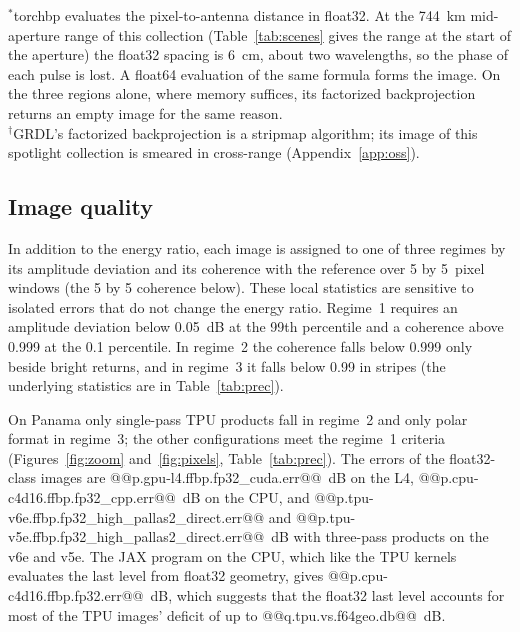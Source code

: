 \documentclass[11pt]{article}
\begin{document}
\begin{table}[tbp]
\smallskip
\begin{minipage}{0.92\textwidth}\footnotesize
$^*$torchbp evaluates the pixel-to-antenna distance in float32. At the 744~km mid-aperture range of this collection (Table~\ref{tab:scenes} gives the range at the start of the aperture) the float32 spacing is 6~cm, about two wavelengths, so the phase of each pulse is lost. A float64 evaluation of the same formula forms the image. On the three regions alone, where memory suffices, its factorized backprojection returns an empty image for the same reason.\\
$^\dagger$GRDL's factorized backprojection is a stripmap algorithm; its image of this spotlight collection is smeared in cross-range (Appendix~\ref{app:oss}).
\end{minipage}
\end{table}

\subsection{Image quality}
\label{sec:quality}

In addition to the energy ratio, each image is assigned to one of three regimes by its amplitude deviation and its coherence with the reference over 5 by 5~pixel windows (the 5 by 5 coherence below). These local statistics are sensitive to isolated errors that do not change the energy ratio. Regime~1 requires an amplitude deviation below 0.05~dB at the 99th percentile and a coherence above 0.999 at the 0.1 percentile. In regime~2 the coherence falls below 0.999 only beside bright returns, and in regime~3 it falls below 0.99 in stripes (the underlying statistics are in Table~\ref{tab:prec}).

On Panama only single-pass TPU products fall in regime~2 and only polar format in regime~3; the other configurations meet the regime~1 criteria (Figures~\ref{fig:zoom} and~\ref{fig:pixels}, Table~\ref{tab:prec}). The errors of the float32-class images are @@p.gpu-l4.ffbp.fp32_cuda.err@@~dB on the L4, @@p.cpu-c4d16.ffbp.fp32_cpp.err@@~dB on the CPU, and @@p.tpu-v6e.ffbp.fp32_high_pallas2_direct.err@@ and @@p.tpu-v5e.ffbp.fp32_high_pallas2_direct.err@@~dB with three-pass products on the v6e and v5e. The JAX program on the CPU, which like the TPU kernels evaluates the last level from float32 geometry, gives @@p.cpu-c4d16.ffbp.fp32.err@@~dB, which suggests that the float32 last level accounts for most of the TPU images' deficit of up to @@q.tpu.vs.f64geo.db@@~dB.
\end{document}
